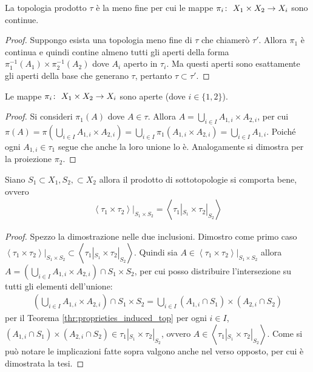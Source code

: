 \begin{theorem}
	La topologia prodotto $\tau$ è la meno fine per cui le mappe $\pi_i \colon\ X_1\times X_2 \rightarrow X_i$ sono continue.
\end{theorem}
\begin{proof}
	Suppongo esista una topologia meno fine di $\tau$ che chiamerò $\tau'$. Allora $\pi_1$ è continua e quindi contine almeno tutti gli aperti della forma $\pi^{-1}_1(A_1) \times \pi^{-1}_2(A_2)$ dove $A_i$ aperto in $\tau_i$. Ma questi aperti sono esattamente gli aperti della base che generano $\tau$, pertanto $\tau \subset \tau'$.
\end{proof}

\begin{theorem}
	Le mappe $\pi_i \colon\ X_1\times X_2 \rightarrow X_i$ sono aperte (dove $i \in \{1,2\}$). 
\end{theorem}
\begin{proof}
	Si consideri $\pi_1(A)$ dove $A \in \tau$. Allora $A = \bigcup_{i \in I} A_{1,i} \times A_{2,i}$, per cui $\pi(A) = \pi(\bigcup_{i \in I} A_{1,i} \times A_{2,i}) = \bigcup_{i\in I} \pi_1 (A_{1,i} \times A_{2,i}) = \bigcup_{i \in I} A_{1,i}$. Poiché ogni $A_{1,i} \in \tau_1$ segue che anche la loro unione lo è. Analogamente si dimostra per la proiezione $\pi_2$.
\end{proof}

\begin{theorem}
	Siano $S_1 \subset X_1, S_2, \subset X_2$ allora il prodotto di sottotopologie si comporta bene, ovvero
	\begin{equation}
	\begin{aligned}
		\left\langle \tau_1 \times \tau_2 \right\rangle|_{S_1 \times S_2} = \left\langle \tau_1|_{S_1} \times \tau_2|_{S_2} \right\rangle 
	\end{aligned}
	\end{equation}
\end{theorem}
\begin{proof}
	Spezzo la dimostrazione nelle due inclusioni. Dimostro come primo caso $	\left\langle \tau_1 \times \tau_2 \right\rangle|_{S_1 \times S_2} \subset \left\langle \tau_1|_{S_1} \times \tau_2|_{S_2} \right\rangle$. Quindi sia $A \in \left\langle \tau_1 \times \tau_2 \right\rangle|_{S_1 \times S_2}$ allora $A = \left( \bigcup_{i \in I} A_{1,i} \times A_{2,i} \right) \cap S_1 \times S_2$, per cui posso distribuire l'intersezione su tutti gli elementi dell'unione:
	\begin{equation}
	\begin{aligned}
		\left( \bigcup_{i \in I} A_{1,i} \times A_{2,i} \right) \cap S_1 \times S_2 = \bigcup_{i \in I} (A_{1,i} \cap S_1) \times (A_{2,i} \cap S_2)
	\end{aligned}
	\end{equation}
	per il Teorema \ref{thr:proprieties_induced_top} per ogni $i \in I$, $(A_{1,i} \cap S_1) \times (A_{2,i} \cap S_2) \in \tau_1|_{S_1} \times \tau_2|_{S_2}$, ovvero $A \in \left\langle \tau_1|_{S_1} \times \tau_2|_{S_2} \right\rangle$. Come si può notare le implicazioni fatte sopra valgono anche nel verso opposto, per cui è dimostrata la tesi.
\end{proof}

